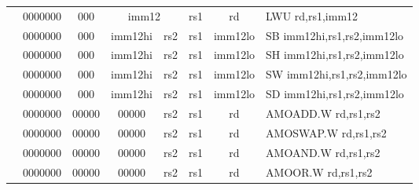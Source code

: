 \begin{table}[p]
\begin{small}
\begin{center}
\begin{tabular}{rcccccccccl}
&
\multicolumn{1}{|c|}{0000000} &
\multicolumn{2}{c|}{000} &
\multicolumn{4}{c|}{imm12} &
\multicolumn{1}{c|}{rs1} &
\multicolumn{1}{c|}{rd} & LWU rd,rs1,imm12 \\
\cline{2-10}
  

&
\multicolumn{1}{|c|}{0000000} &
\multicolumn{2}{c|}{000} &
\multicolumn{3}{c|}{imm12hi} &
\multicolumn{1}{c|}{rs2} &
\multicolumn{1}{c|}{rs1} &
\multicolumn{1}{c|}{imm12lo} & SB imm12hi,rs1,rs2,imm12lo \\
\cline{2-10}
  

&
\multicolumn{1}{|c|}{0000000} &
\multicolumn{2}{c|}{000} &
\multicolumn{3}{c|}{imm12hi} &
\multicolumn{1}{c|}{rs2} &
\multicolumn{1}{c|}{rs1} &
\multicolumn{1}{c|}{imm12lo} & SH imm12hi,rs1,rs2,imm12lo \\
\cline{2-10}
  

&
\multicolumn{1}{|c|}{0000000} &
\multicolumn{2}{c|}{000} &
\multicolumn{3}{c|}{imm12hi} &
\multicolumn{1}{c|}{rs2} &
\multicolumn{1}{c|}{rs1} &
\multicolumn{1}{c|}{imm12lo} & SW imm12hi,rs1,rs2,imm12lo \\
\cline{2-10}
  

&
\multicolumn{1}{|c|}{0000000} &
\multicolumn{2}{c|}{000} &
\multicolumn{3}{c|}{imm12hi} &
\multicolumn{1}{c|}{rs2} &
\multicolumn{1}{c|}{rs1} &
\multicolumn{1}{c|}{imm12lo} & SD imm12hi,rs1,rs2,imm12lo \\
\cline{2-10}
  

&
\multicolumn{1}{|c|}{0000000} &
\multicolumn{3}{c|}{00000} &
\multicolumn{2}{c|}{00000} &
\multicolumn{1}{c|}{rs2} &
\multicolumn{1}{c|}{rs1} &
\multicolumn{1}{c|}{rd} & AMOADD.W rd,rs1,rs2 \\
\cline{2-10}
  

&
\multicolumn{1}{|c|}{0000000} &
\multicolumn{3}{c|}{00000} &
\multicolumn{2}{c|}{00000} &
\multicolumn{1}{c|}{rs2} &
\multicolumn{1}{c|}{rs1} &
\multicolumn{1}{c|}{rd} & AMOSWAP.W rd,rs1,rs2 \\
\cline{2-10}
  

&
\multicolumn{1}{|c|}{0000000} &
\multicolumn{3}{c|}{00000} &
\multicolumn{2}{c|}{00000} &
\multicolumn{1}{c|}{rs2} &
\multicolumn{1}{c|}{rs1} &
\multicolumn{1}{c|}{rd} & AMOAND.W rd,rs1,rs2 \\
\cline{2-10}
  

&
\multicolumn{1}{|c|}{0000000} &
\multicolumn{3}{c|}{00000} &
\multicolumn{2}{c|}{00000} &
\multicolumn{1}{c|}{rs2} &
\multicolumn{1}{c|}{rs1} &
\multicolumn{1}{c|}{rd} & AMOOR.W rd,rs1,rs2 \\
\cline{2-10}
  


\end{tabular}
\end{center}
\end{small}
\end{table}
